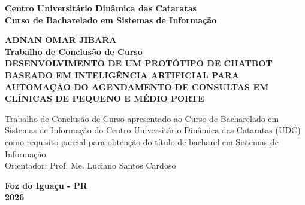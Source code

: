 \documentclass[12pt,a4paper]{extarticle}
\begin{document}
\begin{titlepage}
    \begin{center}
        \textbf{Centro Universitário Dinâmica das Cataratas}\\
        \textbf{Curso de Bacharelado em Sistemas de Informação}\\
        \vspace{3cm}

        \textbf{ADNAN OMAR JIBARA}\\

        \vspace{3cm}
        \textbf{Trabalho de Conclusão de Curso}\\
        \vspace{0.5cm}
        \textbf{DESENVOLVIMENTO DE UM PROTÓTIPO DE CHATBOT BASEADO EM INTELIGÊNCIA ARTIFICIAL PARA AUTOMAÇÃO DO AGENDAMENTO DE CONSULTAS EM CLÍNICAS DE PEQUENO E MÉDIO PORTE}\\

        \vspace{3cm}
        \begin{flushright}
        \begin{minipage}{8cm}
            Trabalho de Conclusão de Curso apresentado ao Curso de Bacharelado em Sistemas de Informação do Centro Universitário Dinâmica das Cataratas (UDC) como requisito parcial para obtenção do título de bacharel em Sistemas de Informação.\\

            Orientador: Prof. Me. Luciano Santos Cardoso
            \vspace{3cm}
        \end{minipage}
        \end{flushright}

        \vfill
        \textbf{Foz do Iguaçu - PR}\\
        \textbf{2026}
    \end{center}
\end{titlepage}
\end{document}
